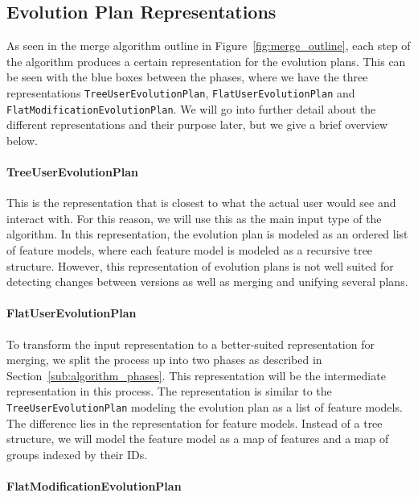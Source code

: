 \documentclass[a4paper,english]{ifimaster}
\begin{document}
\subsection{Evolution Plan Representations}%
\label{sub:evolution_plan_representations}

As seen in the merge algorithm outline in Figure~\ref{fig:merge_outline}, each step of the algorithm produces a certain representation for the evolution plans. This can be seen with the blue boxes between the phases, where we have the three representations \texttt{Tree\-User\-Evolution\-Plan}, \texttt{Flat\-User\-Evolution\-Plan} and \texttt{Flat\-Modification\-Evolution\-Plan}. We will go into further detail about the different representations and their purpose later, but we give a brief overview below.

\paragraph{TreeUserEvolutionPlan}%
\label{par:treeuserevolutionplan}

This is the representation that is closest to what the actual user would see and interact with. For this reason, we will use this as the main input type of the algorithm. In this representation, the evolution plan is modeled as an ordered list of feature models, where each feature model is modeled as a recursive tree structure. However, this representation of evolution plans is not well suited for detecting changes between versions as well as merging and unifying several plans.

\paragraph{FlatUserEvolutionPlan}%
\label{par:flatuserevolutionplan}

To transform the input representation to a better-suited representation for merging, we split the process up into two phases as described in Section~\vref{sub:algorithm_phases}. This representation will be the intermediate representation in this process. The representation is similar to the \texttt{Tree\-User\-Evolution\-Plan} modeling the evolution plan as a list of feature models. The difference lies in the representation for feature models. Instead of a tree structure, we will model the feature model as a map of features and a map of groups indexed by their IDs.

\paragraph{FlatModificationEvolutionPlan}%
\label{par:flatmodificationevolutionplan}
\end{document}
